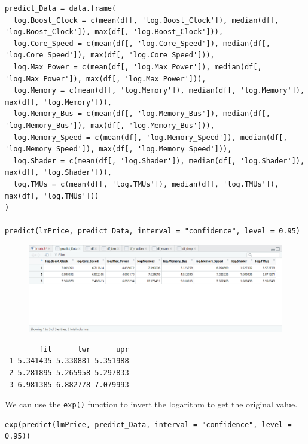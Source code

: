 \documentclass[a4paper]{article}
\begin{document}
\begin{mdframed}[leftline=false,rightline=false,backgroundcolor=lightblue!10,nobreak=false]
    \begin{verbatim}
predict_Data = data.frame(
  log.Boost_Clock = c(mean(df[, 'log.Boost_Clock']), median(df[, 'log.Boost_Clock']), max(df[, 'log.Boost_Clock'])),
  log.Core_Speed = c(mean(df[, 'log.Core_Speed']), median(df[, 'log.Core_Speed']), max(df[, 'log.Core_Speed'])),
  log.Max_Power = c(mean(df[, 'log.Max_Power']), median(df[, 'log.Max_Power']), max(df[, 'log.Max_Power'])),
  log.Memory = c(mean(df[, 'log.Memory']), median(df[, 'log.Memory']), max(df[, 'log.Memory'])),
  log.Memory_Bus = c(mean(df[, 'log.Memory_Bus']), median(df[, 'log.Memory_Bus']), max(df[, 'log.Memory_Bus'])),
  log.Memory_Speed = c(mean(df[, 'log.Memory_Speed']), median(df[, 'log.Memory_Speed']), max(df[, 'log.Memory_Speed'])),
  log.Shader = c(mean(df[, 'log.Shader']), median(df[, 'log.Shader']), max(df[, 'log.Shader'])),
  log.TMUs = c(mean(df[, 'log.TMUs']), median(df[, 'log.TMUs']), max(df[, 'log.TMUs']))
)

predict(lmPrice, predict_Data, interval = "confidence", level = 0.95)
    \end{verbatim}
\end{mdframed}
\begin{figure}[H]
    \centering
    \includegraphics[keepaspectratio, width=1\textwidth, height=1\textheight]{Predict/1.png}
\end{figure}
\begin{lstlisting}
        fit      lwr      upr
 1 5.341435 5.330881 5.351988
 2 5.281895 5.265958 5.297833
 3 6.981385 6.882778 7.079993
\end{lstlisting}
We can use the \verb|exp()| function to invert the logarithm to get the original value.
\begin{mdframed}[leftline=false,rightline=false,backgroundcolor=lightblue!10,nobreak=false]
    \begin{verbatim}
exp(predict(lmPrice, predict_Data, interval = "confidence", level = 0.95))
    \end{verbatim}
\end{mdframed}
\end{document}

